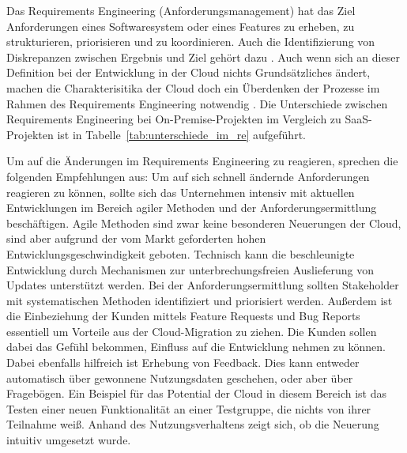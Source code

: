 Das Requirements Engineering (Anforderungsmanagement) hat das Ziel 
Anforderungen eines Softwaresystem oder eines Features zu erheben, zu 
strukturieren, priorisieren und zu 
koordinieren.  Auch die 
Identifizierung von Diskrepanzen zwischen Ergebnis und Ziel gehört dazu 
. Auch wenn sich 
an dieser Definition bei der Entwicklung in der Cloud nichts Grundsätzliches 
ändert, machen die Charakterisitika der Cloud doch ein Überdenken der Prozesse 
im Rahmen des Requirements Engineering notwendig 
.
Die Unterschiede zwischen Requirements Engineering bei On-Premise-Projekten im 
Vergleich zu SaaS-Projekten ist in Tabelle~\ref{tab:unterschiede_im_re} 
aufgeführt.


Um auf die Änderungen im Requirements Engineering zu reagieren, sprechen 
 die folgenden Empfehlungen aus: Um auf sich schnell
ändernde Anforderungen reagieren zu können, sollte sich das Unternehmen intensiv mit aktuellen
Entwicklungen im Bereich agiler Methoden und der Anforderungsermittlung beschäftigen. Agile Methoden 
sind zwar keine besonderen Neuerungen der Cloud, sind aber aufgrund der vom Markt geforderten hohen Entwicklungsgeschwindigkeit geboten. Technisch kann die beschleunigte Entwicklung durch Mechanismen zur unterbrechungsfreien Auslieferung von Updates unterstützt werden. 
Bei der Anforderungsermittlung sollten Stakeholder mit systematischen Methoden identifiziert und priorisiert werden. Außerdem ist die Einbeziehung der Kunden mittels Feature Requests und Bug Reports essentiell um Vorteile aus der Cloud-Migration zu ziehen. Die Kunden sollen dabei das Gefühl bekommen, Einfluss auf die Entwicklung nehmen zu können. Dabei ebenfalls hilfreich ist Erhebung von Feedback. Dies kann entweder automatisch über gewonnene Nutzungsdaten geschehen, oder aber über Fragebögen. Ein Beispiel für das Potential der Cloud in diesem Bereich ist das Testen einer neuen Funktionalität an einer Testgruppe, die nichts von ihrer Teilnahme weiß. Anhand des Nutzungsverhaltens zeigt sich, ob die Neuerung intuitiv umgesetzt wurde. 


